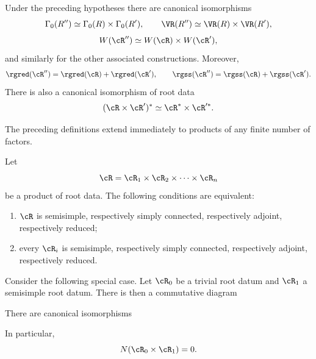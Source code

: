 \begin{proposition}\label{sga3:XXI:6.4.2}
Under the preceding hypotheses there are canonical isomorphisms
\[
 \Gamma_0(R'')\simeq\Gamma_0(R)\times\Gamma_0(R'),
 \qquad
 \VR(R'')\simeq\VR(R)\times\VR(R'),
\]
\[
 W(\cR'')\simeq W(\cR)\times W(\cR'),
\]
and similarly for the other associated constructions. Moreover,
\[
 \rgred(\cR'')=\rgred(\cR)+\rgred(\cR'),
 \qquad
 \rgss(\cR'')=\rgss(\cR)+\rgss(\cR').
\]
There is also a canonical isomorphism of root data
\[
 (\cR\times\cR')^\ast\simeq\cR^\ast\times\cR'^\ast.
\]
\end{proposition}

The preceding definitions extend immediately to products of any finite
number of factors.

\begin{proposition}\label{sga3:XXI:6.4.3}
Let
\[
 \cR=\cR_1\times\cR_2\times\cdots\times\cR_n
\]
be a product of root data. The following conditions are equivalent:
\begin{enumerate}
\item[(i)] \(\cR\) is semisimple, respectively simply connected,
  respectively adjoint, respectively reduced;
\item[(ii)] every \(\cR_i\) is semisimple, respectively simply
  connected, respectively adjoint, respectively reduced.
\end{enumerate}
\end{proposition}

Consider the following special case. Let \(\cR_0\) be a trivial root
datum and \(\cR_1\) a semisimple root datum. There is then a commutative
diagram
\begin{center}
\end{center}

\begin{lemma}\label{sga3:XXI:6.4.4}
There are canonical isomorphisms
\begin{center}
\end{center}
In particular,
\[
 N(\cR_0\times\cR_1)=0.
\]
\end{lemma}

